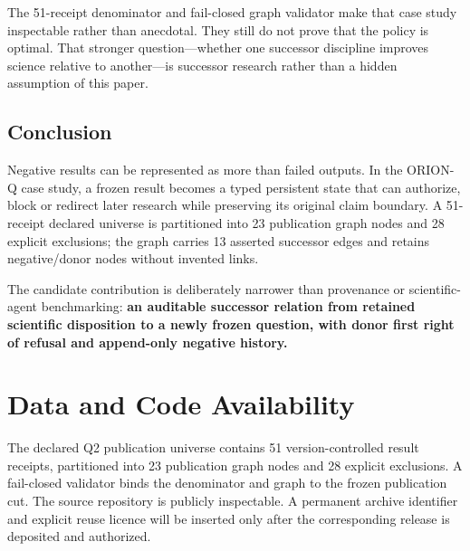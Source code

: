 \documentclass[preprint,12pt]{elsarticle}
\begin{document}
The 51-receipt denominator and fail-closed graph validator make that
case study inspectable rather than anecdotal. They still do not prove
that the policy is optimal. That stronger question---whether one
successor discipline improves science relative to another---is successor
research rather than a hidden assumption of this paper.

\hypertarget{conclusion}{%
\subsection{Conclusion}\label{conclusion}}

Negative results can be represented as more than failed outputs. In the
ORION-Q case study, a frozen result becomes a typed persistent state
that can authorize, block or redirect later research while preserving
its original claim boundary. A 51-receipt declared universe is
partitioned into 23 publication graph nodes and 28 explicit exclusions;
the graph carries 13 asserted successor edges and retains negative/donor
nodes without invented links.

The candidate contribution is deliberately narrower than provenance or
scientific-agent benchmarking: \textbf{an auditable successor relation
from retained scientific disposition to a newly frozen question, with
donor first right of refusal and append-only negative history.}

\section*{Data and Code Availability}
The declared Q2 publication universe contains 51 version-controlled result receipts,
partitioned into 23 publication graph nodes and 28 explicit exclusions. A fail-closed
validator binds the denominator and graph to the frozen publication cut. The source
repository is publicly inspectable. A permanent archive identifier and explicit reuse
licence will be inserted only after the corresponding release is deposited and authorized.



\end{document}
